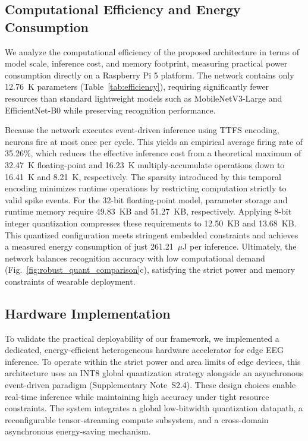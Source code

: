 \documentclass{nsr}
\begin{document}
\subsection{Computational Efficiency and Energy Consumption}

We analyze the computational efficiency of the proposed architecture in terms of model scale, inference cost, and memory footprint, measuring practical power consumption directly on a Raspberry Pi 5 platform. The network contains only 12.76~K parameters (Table~\ref{tab:efficiency}), requiring significantly fewer resources than standard lightweight models such as MobileNetV3-Large and EfficientNet-B0 while preserving recognition performance.

Because the network executes event-driven inference using TTFS encoding, neurons fire at most once per cycle. This yields an empirical average firing rate of 35.26\%, which reduces the effective inference cost from a theoretical maximum of 32.47~K floating-point and 16.23~K multiply-accumulate operations down to 16.41~K and 8.21~K, respectively. The sparsity introduced by this temporal encoding minimizes runtime operations by restricting computation strictly to valid spike events. For the 32-bit floating-point model, parameter storage and runtime memory require 49.83~KB and 51.27~KB, respectively. Applying 8-bit integer quantization compresses these requirements to 12.50~KB and 13.68~KB. This quantized configuration meets stringent embedded constraints and achieves a measured energy consumption of just 261.21~$\mu$J per inference. Ultimately, the network balances recognition accuracy with low computational demand (Fig.~\ref{fig:robust_quant_comparison}c), satisfying the strict power and memory constraints of wearable deployment.



\subsection{Hardware Implementation}

To validate the practical deployability of our framework, we implemented a dedicated, energy-efficient heterogeneous hardware accelerator for edge EEG inference. To operate within the strict power and area limits of edge devices, this architecture uses an INT8 global quantization strategy alongside an asynchronous event-driven paradigm (Supplementary Note~S2.4). These design choices enable real-time inference while maintaining high accuracy under tight resource constraints. The system integrates a global low-bitwidth quantization datapath, a reconfigurable tensor-streaming compute subsystem, and a cross-domain asynchronous energy-saving mechanism.  
\end{document}
